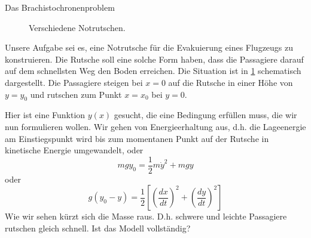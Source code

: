 \begin{example}{Das Brachistochronenproblem}
  \begin{figure}
  \centering
   \caption{Verschiedene Notrutschen.}
  \label{fig:Rutsche}
 \end{figure}
  Unsere Aufgabe sei es, eine Notrutsche für die Evakuierung eines Flugzeugs zu
  konstruieren. Die Rutsche soll eine solche Form haben, dass die Passagiere
  darauf auf dem schnellsten Weg den Boden erreichen.  Die Situation ist in
  \ref{fig:Rutsche} schematisch dargestellt. Die Passagiere steigen bei $x=0$
  auf die Rutsche in einer Höhe von $y=y_0$ und rutschen zum Punkt $x=x_0$ bei
  $y=0$.

  Hier ist eine Funktion $y(x)$ gesucht, die eine Bedingung erfüllen muss, die
  wir nun formulieren wollen. Wir gehen von Energieerhaltung aus, d.h. die
  Lageenergie am Einstiegspunkt wird bis zum momentanen Punkt auf der Rutsche
  in kinetische Energie umgewandelt, oder 
  \[ mgy_0=\frac{1}{2}m\dot{y}^2+mgy\]
  oder
  \begin{equation}
  g(y_0-y)=\frac{1}{2}\left[\left(\frac{dx}{dt}\right)^2
    +\left(\frac{dy}{dt}\right)^2\right]
    \label{eq:Rutschenergie}
  \end{equation}
 Wie wir sehen kürzt sich die Masse raus. D.h. schwere und leichte Passagiere
 rutschen gleich schnell. Ist das Modell vollständig?
 

\end{example}
